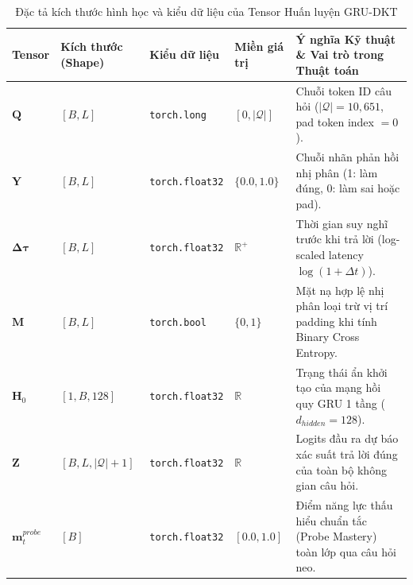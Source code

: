 \begin{table}[htbp]
  \centering\small
  \caption{Đặc tả kích thước hình học và kiểu dữ liệu của Tensor Huấn luyện GRU-DKT}\label{tab:dkt-tensor-shapes}
  \begin{tabularx}{\textwidth}{l p{2.8cm} l p{2.2cm} X}
    \toprule
    \textbf{Tensor} & \textbf{Kích thước (Shape)} & \textbf{Kiểu dữ liệu} & \textbf{Miền giá trị} & \textbf{Ý nghĩa Kỹ thuật \& Vai trò trong Thuật toán} \\
    \midrule
    $\mathbf{Q}$ & $[B, L]$ & \texttt{torch.long} & $[0, |\mathcal{Q}|]$ & Chuỗi token ID câu hỏi ($|\mathcal{Q}| = 10,651$, pad token index $= 0$). \\
    \addlinespace
    $\mathbf{Y}$ & $[B, L]$ & \texttt{torch.float32} & $\{0.0, 1.0\}$ & Chuỗi nhãn phản hồi nhị phân (1: làm đúng, 0: làm sai hoặc pad). \\
    \addlinespace
    $\bm{\Delta\tau}$ & $[B, L]$ & \texttt{torch.float32} & $\mathbb{R}^+$ & Thời gian suy nghĩ trước khi trả lời (log-scaled latency $\log(1 + \Delta t)$). \\
    \addlinespace
    $\mathbf{M}$ & $[B, L]$ & \texttt{torch.bool} & $\{0, 1\}$ & Mặt nạ hợp lệ nhị phân loại trừ vị trí padding khi tính Binary Cross Entropy. \\
    \addlinespace
    $\mathbf{H}_0$ & $[1, B, 128]$ & \texttt{torch.float32} & $\mathbb{R}$ & Trạng thái ẩn khởi tạo của mạng hồi quy GRU 1 tầng ($d_{hidden} = 128$). \\
    \addlinespace
    $\mathbf{Z}$ & $[B, L, |\mathcal{Q}|+1]$ & \texttt{torch.float32} & $\mathbb{R}$ & Logits đầu ra dự báo xác suất trả lời đúng của toàn bộ không gian câu hỏi. \\
    \addlinespace
    $\mathbf{m}_t^{probe}$ & $[B]$ & \texttt{torch.float32} & $[0.0, 1.0]$ & Điểm năng lực thấu hiểu chuẩn tắc (Probe Mastery) toàn lớp qua câu hỏi neo. \\
    \bottomrule
  \end{tabularx}
\end{table}

